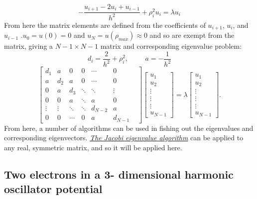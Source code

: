\documentclass[10pt,a4paper]{article}
\begin{document}
\begin{equation*}
-\frac{u_{i+1} -2u_i +u_{i-1}}{h^2}+\rho_i^2u_i= \lambda u_i
\end{equation*}
From here the matrix elements are defined from the coefficients of $u_{i+1}$, $u_{i}$, and $u_{i-1}$ .$u_0 = u(0)= 0$ and $u_N = u(\rho_{max}) \approx 0$ and so are exempt from the matrix, giving a $N-1 \times N-1$ matrix and corresponding eigenvalue problem:
$$
d_i=\frac{2}{h^2}+\rho_i^2,\hspace{1cm}  a=-\frac{1}{h^2}
$$
\begin{equation*}
\begin{bmatrix}
d_1 & a &0  &0  &\cdots  & 0\\ 
 a&  d_2& a & 0 & \cdots &0 \\ 
 0&  a&  d_3& \ddots  &\ddots  &\vdots \\ 
 0& 0 & a &  \ddots& a &0 \\ 
 \vdots&\vdots  &\ddots  &\ddots  &  d_{N-2}&a \\ 
 0& 0 & \cdots & 0 & a &d_{N-1}& 
\end{bmatrix}
  \begin{bmatrix} u_{1} \\
                                                              u_{2} \\
                                                              \vdots\\ \vdots\\ \vdots\\
                                                              u_{N-1}
             \end{bmatrix}=\lambda \begin{bmatrix} u_{1} \\
                                                              u_{2} \\
                                                              \vdots\\ \vdots\\ \vdots\\
                                                              u_{N-1}
             \end{bmatrix}.  
      \label{eq:sematrix}
\end{equation*}
From here, a number of algorithms can be used in fishing out the eigenvalues and corresponding eigenvectors. \hyperref[jacobi algo]{\emph{The Jacobi eigenvalue algorithm}} can be applied to any real, symmetric matrix, and so it will be applied here.
\subsection{Two electrons in a 3- dimensional harmonic oscillator potential}
\end{document}
